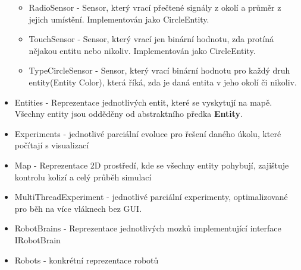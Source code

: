 \documentclass[12pt, oneside]{article}
\begin{document}
\begin{itemize}
\begin{itemize}
\item RadioSensor - Sensor, který vrací přečtené signály z okolí a průměr z jejich umístění. Implementován jako CircleEntity. 
\item TouchSensor - Sensor, který vrací jen binární hodnotu, zda protíná nějakou entitu nebo nikoliv. Implementován jako CircleEntity. 
\item TypeCircleSensor - Sensor, který vrací binární hodnotu pro každý druh entity(Entity Color), která říká, zda je daná entita v jeho okolí či nikoliv.
\end{itemize}
\item Entities - Reprezentace jednotlivých entit, které se vyskytují na mapě. Všechny entity jsou odděděny od abstraktního předka \textbf{Entity}. 
\item Experiments - jednotlivé parciální evoluce pro řešení daného úkolu, které počítají s visualizací
\item Map - Reprezentace 2D prostředí, kde se všechny entity pohybují, zajištuje kontrolu kolizí a celý průběh simulací
\item MultiThreadExperiment - jednotlivé parciální experimenty, optimalizované pro  běh na více vláknech bez GUI. 
\item RobotBrains - Reprezentace jednotlivých mozků implementující interface IRobotBrain
\item Robots - konkrétní reprezentace robotů 


\end{itemize}
\end{document}
